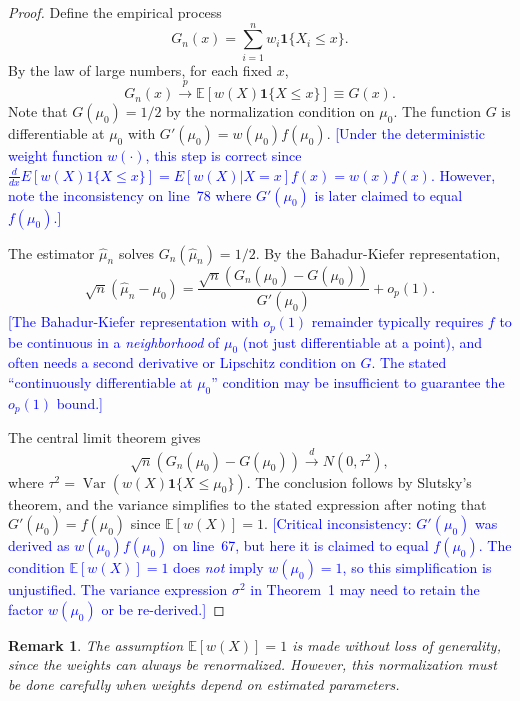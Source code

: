 \documentclass[12pt]{article}
\newtheorem{remark}{Remark}
\newcommand{\techcheck}[1]{\textcolor{blue}{[#1]}}
\begin{document}
\begin{proof}
Define the empirical process
\begin{equation}
    G_n(x) = \sum_{i=1}^n w_i \mathbf{1}\{X_i \leq x\}.
\end{equation}
By the law of large numbers, for each fixed $x$,
\begin{equation}
    G_n(x) \xrightarrow{p} \mathbb{E}[w(X) \mathbf{1}\{X \leq x\}] \equiv G(x).
\end{equation}
Note that $G(\mu_0) = 1/2$ by the normalization condition on $\mu_0$. The function $G$ is differentiable at $\mu_0$ with $G'(\mu_0) = w(\mu_0) f(\mu_0)$.
\techcheck{Under the deterministic weight function $w(\cdot)$, this step is correct since $\frac{d}{dx}E[w(X)1\{X\leq x\}] = E[w(X)|X=x]f(x) = w(x)f(x)$. However, note the inconsistency on line~78 where $G'(\mu_0)$ is later claimed to equal $f(\mu_0)$.}

The estimator $\hat{\mu}_n$ solves $G_n(\hat{\mu}_n) = 1/2$. By the Bahadur-Kiefer representation,
\begin{equation}
    \sqrt{n}(\hat{\mu}_n - \mu_0) = \frac{\sqrt{n}(G_n(\mu_0) - G(\mu_0))}{G'(\mu_0)} + o_p(1).
\end{equation}
\techcheck{The Bahadur-Kiefer representation with $o_p(1)$ remainder typically requires $f$ to be continuous in a \emph{neighborhood} of $\mu_0$ (not just differentiable at a point), and often needs a second derivative or Lipschitz condition on $G$. The stated ``continuously differentiable at $\mu_0$'' condition may be insufficient to guarantee the $o_p(1)$ bound.}

The central limit theorem gives
\begin{equation}
    \sqrt{n}(G_n(\mu_0) - G(\mu_0)) \xrightarrow{d} N(0, \tau^2),
\end{equation}
where $\tau^2 = \operatorname{Var}(w(X) \mathbf{1}\{X \leq \mu_0\})$. The conclusion follows by Slutsky's theorem, and the variance simplifies to the stated expression after noting that $G'(\mu_0) = f(\mu_0)$ since $\mathbb{E}[w(X)] = 1$.
\techcheck{Critical inconsistency: $G'(\mu_0)$ was derived as $w(\mu_0)f(\mu_0)$ on line~67, but here it is claimed to equal $f(\mu_0)$. The condition $\mathbb{E}[w(X)]=1$ does \emph{not} imply $w(\mu_0)=1$, so this simplification is unjustified. The variance expression $\sigma^2$ in Theorem~1 may need to retain the factor $w(\mu_0)$ or be re-derived.}
\end{proof}

\begin{remark}
The assumption $\mathbb{E}[w(X)] = 1$ is made without loss of generality, since the weights can always be renormalized. However, this normalization must be done carefully when weights depend on estimated parameters.
\end{remark}
\end{document}

